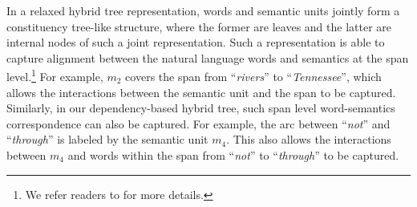 In a relaxed hybrid tree representation, words and semantic units jointly form a constituency tree-like structure, where the former are  leaves and the latter are internal nodes of such a joint representation.
Such a representation is able to capture alignment between the natural language words and semantics at the span level.\footnote{We refer readers to \cite{lu2014semantic} for more details.}
For example, $m_2$ covers the span from ``{\em rivers}'' to ``{\em Tennessee}'', which allows the interactions between the semantic unit and the span to be captured.
Similarly, in our {dependency-based hybrid tree}, 
such span level word-semantics correspondence can also be captured. 
For example, the arc between ``{\em not}'' and ``{\em through}'' is labeled by the semantic unit $m_4$.
This also allows the interactions between $m_4$ and words within the span from ``{\em not}'' to ``{\em through}'' to be captured.




